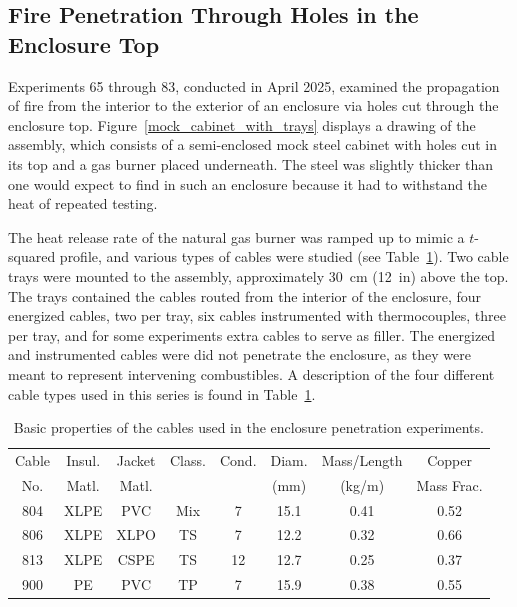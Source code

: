 \clearpage


\subsection{Fire Penetration Through Holes in the Enclosure Top}

Experiments 65 through 83, conducted in April 2025, examined the propagation of fire from the interior to the exterior of an enclosure via holes cut through the enclosure top. Figure~\ref{mock_cabinet_with_trays} displays a drawing of the assembly, which consists of a semi-enclosed mock steel cabinet with holes cut in its top and a gas burner placed underneath. The steel was slightly thicker than one would expect to find in such an enclosure because it had to withstand the heat of repeated testing.

The heat release rate of the natural gas burner was ramped up to mimic a $t$-squared profile, and various types of cables were studied (see Table~\ref{cables}). Two cable trays were mounted to the assembly, approximately 30~cm (12~in) above the top. The trays contained the cables routed from the interior of the enclosure, four energized cables, two per tray, six cables instrumented with thermocouples, three per tray, and for some experiments extra cables to serve as filler. The energized and instrumented cables were did not penetrate the enclosure, as they were meant to represent intervening combustibles. A description of the four different cable types used in this series is found in Table~\ref{cables}.

\begin{table}[ht]
\centering
\caption[Basic properties of cables]{Basic properties of the cables used in the enclosure penetration experiments.}
\label{cables}
\begin{tabular}{|c|c|c|c|c|c|c|c|}
\hline
Cable & Insul.  & Jacket  & Class.  & Cond.  & Diam.  & Mass/Length & Copper     \\
No.   & Matl.   & Matl.   &         &        & (mm)   & (kg/m)      & Mass Frac. \\ \hline
804   & XLPE    & PVC     & Mix     & 7      & 15.1   & 0.41        & 0.52       \\ \hline
806   & XLPE    & XLPO    & TS      & 7      & 12.2   & 0.32        & 0.66       \\ \hline
813   & XLPE    & CSPE    & TS      & 12     & 12.7   & 0.25        & 0.37       \\ \hline
900   & PE      & PVC     & TP      & 7      & 15.9   & 0.38        & 0.55       \\ \hline
\end{tabular}
\end{table}

